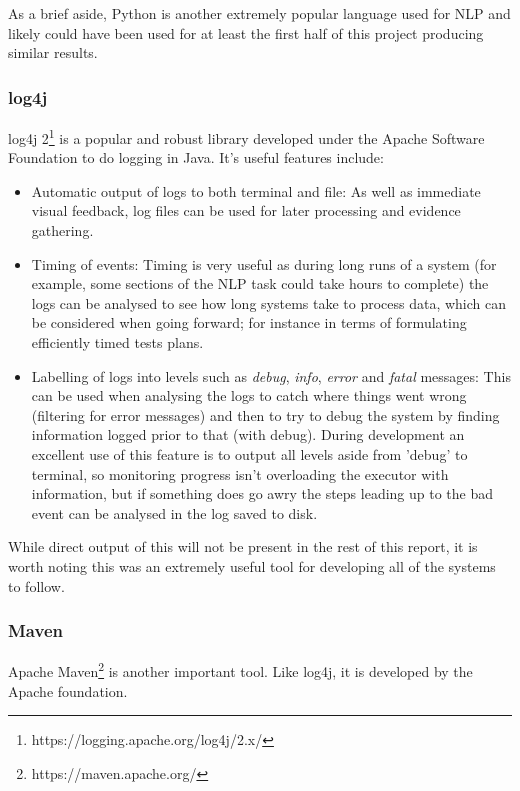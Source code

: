 As a brief aside, Python is another extremely popular language used for NLP and likely could have been used for at least the first half of this project producing similar results.

\subsubsection*{log4j}
log4j 2\footnote{https://logging.apache.org/log4j/2.x/} is a popular and robust library developed under the Apache Software Foundation to do logging in Java. It's useful features include:
\begin{itemize}
	\item Automatic output of logs to both terminal and file: As well as immediate visual feedback, log files can be used for later processing and evidence gathering.
	\item Timing of events: Timing is very useful as during long runs of a system (for example, some sections of the NLP task could take hours to complete) the logs can be analysed to see how long systems take to process data, which can be considered when going forward; for instance in terms of formulating efficiently timed tests plans.
	\item Labelling of logs into levels such as \textit{debug}, \textit{info}, \textit{error} and \textit{fatal} messages: This can be used when analysing the logs to catch where things went wrong (filtering for error messages) and then to try to debug the system by finding information logged prior to that (with debug). During development an excellent use of this feature is to output all levels aside from 'debug' to terminal, so monitoring progress isn't overloading the executor with information, but if something does go awry the steps leading up to the bad event can be analysed in the log saved to disk.
\end{itemize}

While direct output of this will not be present in the rest of this report, it is worth noting this was an extremely useful tool for developing all of the systems to follow. 

\subsubsection*{Maven}
Apache Maven\footnote{https://maven.apache.org/} is another important tool. Like log4j, it is developed by the Apache foundation. 

